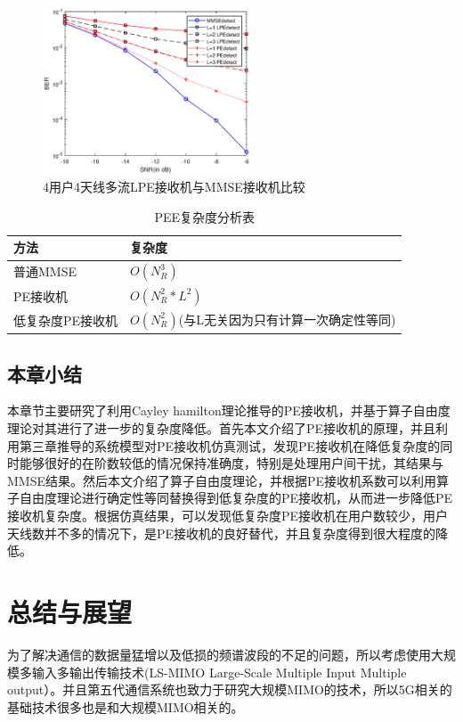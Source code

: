 \documentclass[bachelor,nocolorlinks, printoneside]{seuthesis} %
\begin{document}
\begin{Main}
\begin{figure}[htbp!]
\end{figure}
\begin{figure}[htbp!]
	\centering \includegraphics[width=0.55\textwidth]{img/4_11.eps} \caption{4用户4天线多流LPE接收机与MMSE接收机比较}
\end{figure}

\begin{table}[htbp]
	\centering
	\caption{\label{tab:complexity2}PEE复杂度分析表}
	\begin{tabular}{ll}
		\toprule
		方法 & 复杂度 \\
		\bottomrule
		普通MMSE & $O(N_R^3)$ \\
		PE接收机 & $O(N_R^2*L^2)$ \\
		低复杂度PE接收机 & $O(N_R^2)$(与L无关因为只有计算一次确定性等同)\\
		\bottomrule
	\end{tabular}
\end{table}

\section{本章小结}
本章节主要研究了利用Cayley hamilton理论推导的PE接收机，并基于算子自由度理论对其进行了进一步的复杂度降低。首先本文介绍了PE接收机的原理，并且利用第三章推导的系统模型对PE接收机仿真测试，发现PE接收机在降低复杂度的同时能够很好的在阶数较低的情况保持准确度，特别是处理用户间干扰，其结果与MMSE结果。然后本文介绍了算子自由度理论，并根据PE接收机系数可以利用算子自由度理论进行确定性等同替换得到低复杂度的PE接收机，从而进一步降低PE接收机复杂度。根据仿真结果，可以发现低复杂度PE接收机在用户数较少，用户天线数并不多的情况下，是PE接收机的良好替代，并且复杂度得到很大程度的降低。

\chapter{总结与展望}
为了解决通信的数据量猛增以及低损的频谱波段的不足的问题，所以考虑使用大规模多输入多输出传输技术(LS-MIMO Large-Scale Multiple Input Multiple output）。并且第五代通信系统也致力于研究大规模MIMO的技术，所以5G相关的基础技术很多也是和大规模MIMO相关的。

\end{Main}
\end{document}
